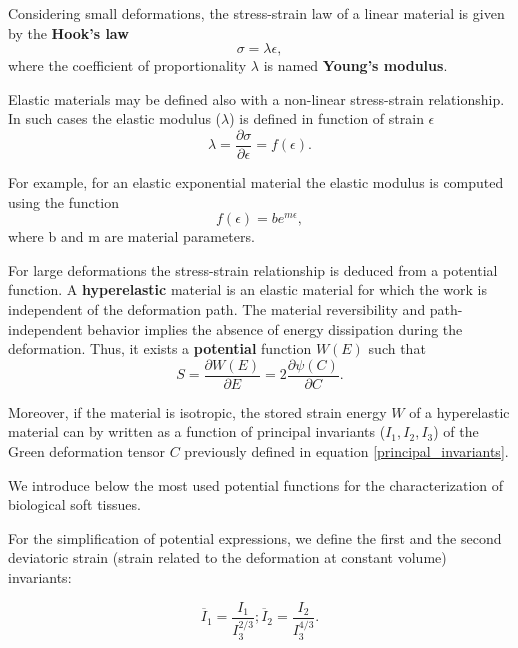 Considering small deformations, the stress-strain law of a linear material is given by the \textbf{Hook's law}
\begin{equation}
\sigma = \lambda \epsilon,
\end{equation}
where  the coefficient of proportionality $\lambda$  is named \textbf{Young's modulus}. 

 Elastic materials may be defined also with a non-linear stress-strain relationship. In such cases the elastic modulus ($\lambda $) is defined in function of strain $\epsilon$ 
 \begin{equation}
 \lambda = \frac{\partial \sigma}{\partial \epsilon} = f(\epsilon).
 \end{equation}

For example, for an elastic exponential material \citep{azar_methods_2002} the elastic modulus is computed using the function 
\begin{equation}
f(\epsilon) = b e^{m \epsilon},
\end{equation} 
where b and m are material parameters.
 
For large deformations the stress-strain relationship is deduced from a potential function. A \textbf{hyperelastic} material is an elastic material for which the work is independent of the deformation path. The material reversibility and path-independent behavior implies the absence of energy dissipation during the deformation. Thus, it exists a \textbf{potential} function $W(E)$ such that
\begin{equation}
 S = \frac{\partial W(E)}{\partial E}= 2\frac{\partial \psi (C)}{\partial C}.
\end{equation}

Moreover, if the material is isotropic, the stored strain energy $W$ of a hyperelastic material can by written as a function of principal invariants ($I_1, I_2, I_3$) of the Green deformation tensor $C$ previously defined in equation \ref{principal_invariants}.

We introduce below the most used potential functions for the characterization of biological soft tissues.
 
For the simplification of potential expressions, we define the first and the second deviatoric strain (strain related to the deformation at constant volume) invariants:

\begin{center}
\begin{equation}
\overline{I}_1=\frac{I_1}{I_3^{2/3}} ; \overline{I}_2=\frac{I_2}{I_3^{4/3}}.
\end{equation}
\end{center}

